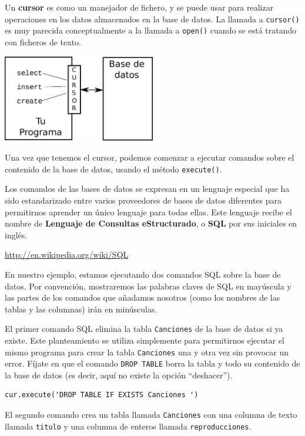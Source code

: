 Un {\bf cursor} es como un manejador de fichero, y se puede usar para realizar
operaciones en los datos almacenados en la base de datos. La llamada a
{\tt cursor()} es muy parecida conceptualmente a la llamada a
{\tt open()} cuando se está tratando con ficheros de texto.

\beforefig
\centerline{\includegraphics[height=1.50in]{figs2/cursor.eps}}
\afterfig

Una vez que tenemos el cursor, podemos comenzar a ejecutar
comandos sobre el contenido de la base de datos, usando el método
{\tt execute()}.

Los comandos de las bases de datos se expresan en un lenguaje especial que ha
sido estandarizado entre varios proveedores de bases de datos diferentes
para permitirnos aprender un único lenguaje para todas ellas. Este lenguaje
recibe el nombre de {\bf Lenguaje de Consultas eStructurado}, o {\bf SQL}
por sus iniciales en inglés.

\url{http://en.wikipedia.org/wiki/SQL}

En nuestro ejemplo, estamos ejecutando dos comandos SQL sobre la base de datos.
Por convención, mostraremos las palabras claves de SQL en mayúscula
y las partes de los comandos que añadamos nosotros (como los nombres
de las tablas y las columnas) irán en minúsculas.

El primer comando SQL elimina la tabla {\tt Canciones} de la
base de datos si ya existe. Este planteamiento se utiliza simplemente para permitirnos
ejecutar el mismo programa para crear la tabla {\tt Canciones} una y
otra vez sin provocar un error. Fíjate en que el comando
{\tt DROP TABLE} borra la tabla y todo su contenido
de la base de datos (es decir, aquí no existe la opción ``deshacer'').

\beforeverb
\begin{verbatim}
cur.execute('DROP TABLE IF EXISTS Canciones ')
\end{verbatim}
\afterverb
%
El segundo comando crea un tabla llamada
{\tt Canciones} con una columna de texto llamada {\tt titulo}
y una columna de enteros llamada {\tt reproducciones}.

